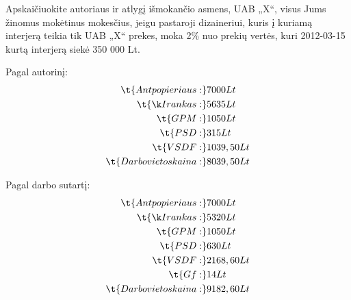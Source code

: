 \begin{exmp}
  Apskaičiuokite autoriaus ir atlygį išmokančio asmens, UAB „X“,
  visus Jums žinomus mokėtinus mokesčius, jeigu pastaroji dizaineriui,
  kuris į kuriamą interjerą teikia tik UAB „X“ prekes, moka 2\%
  nuo prekių vertės, kuri 2012-03-15 kurtą interjerą siekė
  350 000 Lt.

  Pagal autorinį:
  \begin{align*}
    \t{Ant popieriaus:} & 7000 Lt \\
    \t{Į rankas:} & 5635 Lt \\
    \t{GPM:} & 1050 Lt \\
    \t{PSD:} & 315 Lt \\
    \t{VSDF:} & 1039,50 Lt \\
    \t{Darbo vietos kaina:} & 8039,50 Lt \\
  \end{align*}

  Pagal darbo sutartį:
  \begin{align*}
    \t{Ant popieriaus:} & 7000 Lt \\
    \t{Į rankas:} & 5320 Lt \\
    \t{GPM:} & 1050 Lt \\
    \t{PSD:} & 630 Lt \\
    \t{VSDF:} & 2168,60 Lt \\
    \t{Gf:} & 14 Lt \\
    \t{Darbo vietos kaina:} & 9182,60 Lt \\
  \end{align*}
\end{exmp}

